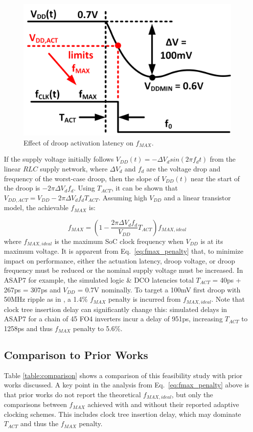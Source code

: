 \documentclass[twoside,9pt,journal,letterpage]{IEEEtran}
\begin{document}
\vspace{-7pt}
\begin{figure}[h]
	\centering
	\includegraphics[width=0.6\columnwidth]{fig_drooplatency}
	\caption{Effect of droop activation latency on $f_{MAX}$.}
	\label{fig:drooplatency}
\end{figure}

If the supply voltage initially follows $V_{DD}(t) = -\Delta V_{d}sin(2\pi f_{d}t)$ from the linear $RLC$ supply network, where $\Delta V_{d}$ and $f_{d}$ are the voltage drop and frequency of the worst-case droop, then the slope of $V_{DD}(t)$ near the start of the droop is $-2\pi \Delta V_{d}f_{d}$. Using $T_{ACT}$, it can be shown that $V_{DD,ACT} = V_{DD}-2\pi \Delta V_{d}f_{d}T_{ACT}$. Assuming high $V_{DD}$ and a linear transistor model, the achievable $f_{MAX}$ is:

\begin{equation}
\label{eq:fmax_penalty}
f_{MAX} = (1 - \frac{2\pi\Delta V_{d}f_{d}}{V_{DD}}T_{ACT})f_{MAX,ideal}
\end{equation} 
where $f_{MAX,ideal}$ is the maximum SoC clock frequency when $V_{DD}$ is at its maximum voltage. It is apparent from Eq.\ \ref{eq:fmax_penalty} that, to minimize impact on performance, either the actuation latency, droop voltage, or droop frequency must be reduced or the nominal supply voltage must be increased. In ASAP7 for example, the simulated logic \& DCO latencies total $T_{ACT}$ = 40ps + 267ps = 307ps and $V_{DD}$ = 0.7V nominally. To target a 100mV first droop with 50MHz ripple as in \cite{hashimoto2018}, a 1.4\% $f_{MAX}$ penalty is incurred from $f_{MAX,ideal}$. Note that clock tree insertion delay can significantly change this: simulated delays in ASAP7 for a chain of 45 FO4 inverters incur a delay of 951ps, increasing $T_{ACT}$ to 1258ps and thus $f_{MAX}$ penalty to 5.6\%.

\vspace{-5pt}
\subsection{Comparison to Prior Works}
\label{sec:comp-priors}
Table \ref{table:comparison} shows a comparison of this feasibility study with prior works discussed. A key point in the analysis from Eq.\ \ref{eq:fmax_penalty} above is that prior works do not report the theoretical $f_{MAX,ideal}$, but only the comparisons between $f_{MAX}$ achieved with and without their reported adaptive clocking schemes. This includes clock tree insertion delay, which may dominate $T_{ACT}$ and thus the $f_{MAX}$ penalty.
\end{document}
